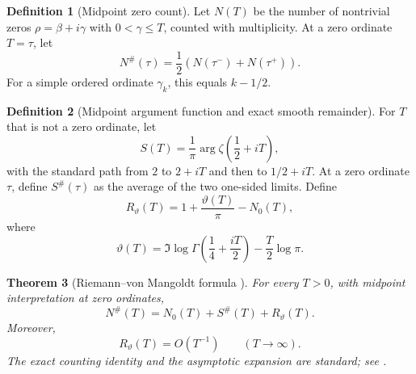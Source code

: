 \documentclass[11pt]{amsart}
\numberwithin{equation}{section}
\theoremstyle{plain}
\newtheorem{theorem}{Theorem}[section]
\theoremstyle{definition}
\newtheorem{definition}[theorem]{Definition}
\theoremstyle{remark}
\newcommand{\1}{\mathbf{1}}
\begin{document}
\begin{definition}[Midpoint zero count]
\label{def:midpoint_zero_count}
Let \(N(T)\) be the number of nontrivial zeros \(\rho=\beta+i\gamma\)
with \(0<\gamma\leq T\), counted with multiplicity.  At a zero ordinate
\(T=\tau\), let
\begin{equation}
N^{\#}(\tau)
=
\frac12\left(N(\tau^-)+N(\tau^+)\right).
\label{eq:midpoint_zero_count}
\end{equation}
For a simple ordered ordinate \(\gamma_k\), this equals \(k-1/2\).
\end{definition}

\begin{definition}[Midpoint argument function and exact smooth remainder]
\label{def:rvm_midpoint_argument_remainder}
For \(T\) that is not a zero ordinate, let
\begin{equation}
S(T)
=
\frac1\pi\arg\zeta\!\left(\frac12+iT\right),
\label{eq:rvm_S_function}
\end{equation}
with the standard path from \(2\) to \(2+iT\) and then to
\(1/2+iT\).  At a zero ordinate \(\tau\), define \(S^{\#}(\tau)\) as the
average of the two one-sided limits.  Define
\begin{equation}
R_\vartheta(T)
=
1+\frac{\vartheta(T)}{\pi}-N_0(T),
\label{eq:rvm_exact_smooth_remainder}
\end{equation}
where
\begin{equation}
\vartheta(T)
=
\Im\log\Gamma\!\left(\frac14+\frac{iT}{2}\right)
-
\frac T2\log\pi.
\label{eq:riemann_siegel_theta}
\end{equation}
\end{definition}


\begin{theorem}[Riemann--von Mangoldt formula {}]
\label{thm:rvm_formula}
For every \(T>0\), with midpoint interpretation at zero ordinates,
\begin{equation}
\boxed{
N^{\#}(T)
=
N_0(T)+S^{\#}(T)+R_\vartheta(T).
}
\label{eq:rvm_formula}
\end{equation}
Moreover,
\begin{equation}
R_\vartheta(T)=O(T^{-1})
\qquad(T\to\infty).
\label{eq:rvm_remainder}
\end{equation}
The exact counting identity and the asymptotic expansion are standard; see
\cite[Chapter~9]{Titchmarsh1986}.
\end{theorem}
\end{document}

